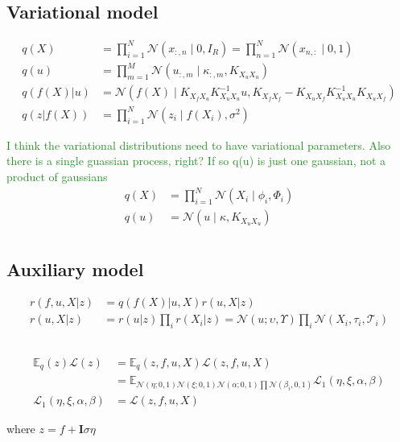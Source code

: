 \documentclass[12pt]{article}
\newcommand{\chris}[1]{\textcolor{ForestGreen}{#1}}
\newcommand{\Tau}{\mathcal{T}}
\newcommand{\Kff}{K_{X_fX_f}}
\newcommand{\Kuu}{K_{X_uX_u}}
\newcommand{\Kuf}{K_{X_uX_f}}
\newcommand{\Kfu}{K_{X_fX_u}}
\newcommand{\Ex}{\mathbb{E}}
\newcommand{\No}{\mathcal{N}}
\begin{document}
\subsection{Variational model}
%
\begin{align}
q(X) &= \prod_{i=1}^N \mathcal{N}(x_{:,n}\mid 0, I_R) = \prod_{n=1}^N \mathcal{N}(x_{n,:}\mid 0,1)
     \\
    q(u) &= \prod_{m=1}^M \mathcal{N}(u_{:,m}\mid \kappa_{:,m}, \Kuu)\\
    q(f(X)|u) &= \mathcal{N}(f(X)\mid \Kfu\Kuu^{-1}u, \Kff-\Kuf\Kuu^{-1}\Kuf)\\
    q(z|f(X)) &= \prod_{i=1}^N \mathcal{N}(z_i\mid f(X_i), \sigma^2)
\end{align}

\chris{I think the variational distributions need to have variational parameters. Also there is a single guassian process, right? If so q(u) is just one gaussian, not a product of gaussians}
\begin{align}
    q(X) &= \prod_{i=1}^N \mathcal{N}(X_i\mid \phi_i, \Phi_i)\\
    q(u) &= \mathcal{N}(u \mid \kappa, K_{X_uX_u})\\
\end{align}

\subsection{Auxiliary model}
%
\begin{align}
    r(f,u,X|z) &= q(f(X)|u,X)r(u,X|z)\\
    r(u,X|z) &= r(u| z) \prod_i r(X_i|z) = \mathcal{N}(u; \upsilon, \Upsilon ) \prod_i \mathcal{N}( X_i, \tau_i, \Tau_i )
\end{align}



\subsection{}

\begin{align}
\Ex_q(z) \mathcal{L}(z) &= \Ex_q(z,f,u,X) \mathcal{L}(z,f,u,X) \\
&= \Ex_{\No(\eta;0,1)\No(\xi;0,1)\No(\alpha;0,1)\prod\No(\beta_i,0,1)} \mathcal{L}_1(\eta,\xi,\alpha,\beta) \\
\mathcal{L}_1(\eta,\xi,\alpha,\beta) &=  \mathcal{L}(z,f,u,X)
\end{align}

where  $z = f + \mathbf{I}\sigma\eta $
\end{document}

